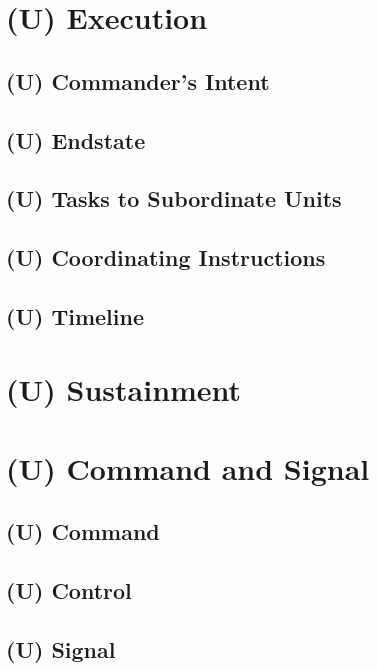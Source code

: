 \documentclass[12pt,letterpaper,notitlepage]{article}
\newcommand{\PM}[1][U]{ {(#1)} }  %
\begin{document}
\section{\PM Execution}
\subsection{\PM Commander's Intent}
\subsection{\PM Endstate}
\subsection{\PM Tasks to Subordinate Units}
\subsection{\PM Coordinating Instructions}
\subsection{\PM Timeline}

\section{\PM Sustainment}

\section{\PM Command and Signal}
\subsection{\PM Command}
\subsection{\PM Control}
\subsection{\PM Signal}
\end{document}
